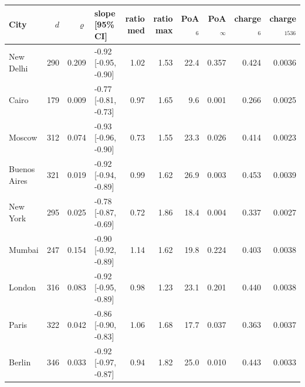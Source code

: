 \begin{tabular}{lrrlrrrrrr}
\toprule
City & $d$ & $\varrho$ & slope [95\% CI] & ratio med & ratio max & PoA$_6$ & PoA$_\infty$ & charge$_6$ & charge$_{1536}$\\
\midrule
New Delhi & 290 & 0.209 & -0.92 [-0.95, -0.90] & 1.02 & 1.53 & 22.4 & 0.357 & 0.424 & 0.0036\\
Cairo & 179 & 0.009 & -0.77 [-0.81, -0.73] & 0.97 & 1.65 & 9.6 & 0.001 & 0.266 & 0.0025\\
Moscow & 312 & 0.074 & -0.93 [-0.96, -0.90] & 0.73 & 1.55 & 23.3 & 0.026 & 0.414 & 0.0023\\
Buenos Aires & 321 & 0.019 & -0.92 [-0.94, -0.89] & 0.99 & 1.62 & 26.9 & 0.003 & 0.453 & 0.0039\\
New York & 295 & 0.025 & -0.78 [-0.87, -0.69] & 0.72 & 1.86 & 18.4 & 0.004 & 0.337 & 0.0027\\
Mumbai & 247 & 0.154 & -0.90 [-0.92, -0.89] & 1.14 & 1.62 & 19.8 & 0.224 & 0.403 & 0.0038\\
London & 316 & 0.083 & -0.92 [-0.95, -0.89] & 0.98 & 1.23 & 23.1 & 0.201 & 0.440 & 0.0038\\
Paris & 322 & 0.042 & -0.86 [-0.90, -0.83] & 1.06 & 1.68 & 17.7 & 0.037 & 0.363 & 0.0037\\
Berlin & 346 & 0.033 & -0.92 [-0.97, -0.87] & 0.94 & 1.82 & 25.0 & 0.010 & 0.443 & 0.0033\\
\bottomrule
\end{tabular}
